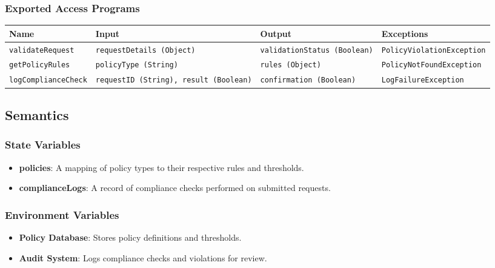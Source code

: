 \documentclass[12pt, titlepage]{article}
\begin{document}
\subsubsection{Exported Access Programs}
\begin{center}
    \begin{tabular}{|p{3cm}|p{4cm}|p{4cm}|p{4cm}|}
        \hline
        \textbf{Name} & \textbf{Input} & \textbf{Output} & \textbf{Exceptions} \\
        \hline
        \texttt{validateRequest} & \texttt{requestDetails (Object)} & \texttt{validationStatus (Boolean)} & \texttt{PolicyViolationException} \\
        \hline
        \texttt{getPolicyRules} & \texttt{policyType (String)} & \texttt{rules (Object)} & \texttt{PolicyNotFoundException} \\
        \hline
        \texttt{logComplianceCheck} & \texttt{requestID (String), result (Boolean)} & \texttt{confirmation (Boolean)} & \texttt{LogFailureException} \\
        \hline
    \end{tabular}
\end{center}

\subsection{Semantics}

\subsubsection{State Variables}
\begin{itemize}
    \item \textbf{policies}: A mapping of policy types to their respective rules and thresholds.
    \item \textbf{complianceLogs}: A record of compliance checks performed on submitted requests.
\end{itemize}

\subsubsection{Environment Variables}
\begin{itemize}
    \item \textbf{Policy Database}: Stores policy definitions and thresholds.
    \item \textbf{Audit System}: Logs compliance checks and violations for review.
\end{itemize}
\end{document}
